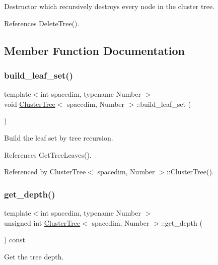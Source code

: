Destructor which recursively destroys every node in the cluster tree. 

References Delete\+Tree().



\subsection{Member Function Documentation}
\mbox{\label{classClusterTree_a1e7dc037d01b3e15f1d6b4eacac59cb1}} 
\subsubsection{\texorpdfstring{build\+\_\+leaf\+\_\+set()}{build\_leaf\_set()}}
{\footnotesize\ttfamily template$<$int spacedim, typename Number $>$ \\
void \hyperlink{classClusterTree}{Cluster\+Tree}$<$ spacedim, Number $>$\+::build\+\_\+leaf\+\_\+set (\begin{DoxyParamCaption}{ }\end{DoxyParamCaption})}

Build the leaf set by tree recursion. 

References Get\+Tree\+Leaves().



Referenced by Cluster\+Tree$<$ spacedim, Number $>$\+::\+Cluster\+Tree().

\mbox{\label{classClusterTree_a2bd8dd175c4459338d76a8cb879afccf}} 
\subsubsection{\texorpdfstring{get\+\_\+depth()}{get\_depth()}}
{\footnotesize\ttfamily template$<$int spacedim, typename Number $>$ \\
unsigned int \hyperlink{classClusterTree}{Cluster\+Tree}$<$ spacedim, Number $>$\+::get\+\_\+depth (\begin{DoxyParamCaption}{ }\end{DoxyParamCaption}) const}

Get the tree depth. 


